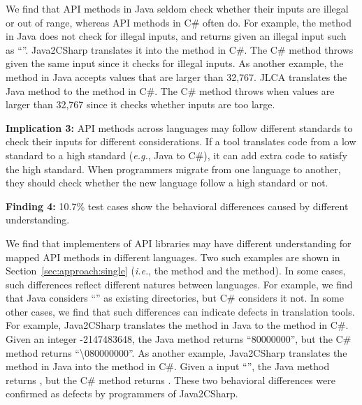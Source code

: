 We find that API methods in Java seldom check whether their inputs are illegal or out of range, whereas API methods in C\# often do. For example, the  method in Java does not check for illegal inputs, and returns  given an illegal input such as ``''. Java2CSharp translates it into the  method in C\#. The C\# method throws  given the same input since it checks for illegal inputs. As another example, the  method in Java accepts values that are larger than 32,767. JLCA translates the Java method to the  method in C\#. The C\# method throws  when values are larger than 32,767 since it checks whether inputs are too large.

\textbf{Implication 3:} API methods across languages may follow different standards to check their inputs for different considerations. If a tool translates code from a low standard to a high standard (\emph{e.g.}, Java to C\#), it can add extra code to satisfy the high standard. When programmers migrate from one language to another, they should check whether the new language follow a high standard or not.

\textbf{Finding 4:} 10.7\% test cases show the behavioral differences caused by different understanding.


We find that implementers of API libraries may have different understanding for mapped API methods in different languages. Two such examples are shown in Section~\ref{sec:approach:single} (\emph{i.e.}, the  method and the  method). In some cases, such differences reflect different natures between languages. For example, we find that Java considers ``\CodeIn{\textbackslash}'' as existing directories, but  C\# considers it not. In some other cases, we find that such differences can indicate defects in translation tools. For example, Java2CSharp translates the  method in Java to the  method in C\#.
Given an integer -2147483648, the Java method returns ``80000000'', but the C\# method returns ``\textbackslash080000000''. As another example, Java2CSharp translates the  method in Java into the  method in C\#. Given a input ``'', the Java method returns , but the C\# method returns . These two behavioral differences were confirmed as defects by programmers of Java2CSharp.

